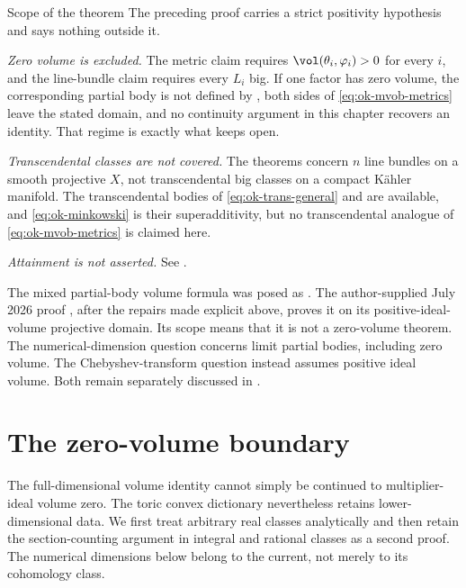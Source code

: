 \begin{warning}{Scope of the theorem}
\label{warn:ok-mixed-scope}
The preceding proof carries a strict positivity hypothesis and says nothing
outside it.

\emph{Zero volume is excluded.}  The metric claim requires
$\vol(\theta_i,\varphi_i)>0$ for every $i$, and
the line-bundle claim requires every $L_i$ big.  If one factor
has zero volume, the corresponding partial body is not defined by
, both sides of
\eqref{eq:ok-mvob-metrics} leave the stated domain, and no continuity
argument in this chapter recovers an identity.  That regime is exactly what
 keeps open.

\emph{Transcendental classes are not covered.}  The theorems concern $n$
line bundles on a smooth projective $X$, not transcendental big
classes on a compact K\"ahler manifold.  The transcendental bodies of
\eqref{eq:ok-trans-general} and  are
available, and \eqref{eq:ok-minkowski} is their superadditivity, but no
transcendental analogue of \eqref{eq:ok-mvob-metrics} is claimed here.

\emph{Attainment is not asserted.}  See .
\end{warning}

\begin{remark}[Status]
\label{rem:ok-mixed-status}
The mixed partial-body volume formula was posed as
\cite[Conjecture~8.8]{Xia21}.  The author-supplied July 2026 proof
\cite{XiaMVOB}, after the repairs made explicit above, proves it on its
positive-ideal-volume projective domain.  Its scope means that it is not a
zero-volume theorem.  The numerical-dimension question
\cite[Conjecture~5.29]{Xia21} concerns limit partial bodies, including
zero volume.  The Chebyshev-transform question
\cite[Section~6.4, p.~1325]{Xia21} instead assumes positive ideal volume.
Both remain separately discussed in .
\end{remark}

\section{The zero-volume boundary}
\label{sec:ok-zero-volume}

The full-dimensional volume identity cannot simply be continued to
multiplier-ideal volume zero.
The toric convex dictionary nevertheless retains lower-dimensional data.
We first treat arbitrary real classes analytically and then retain the
section-counting argument in integral and rational classes as a second
proof.  The numerical dimensions below belong to the current, not merely to
its cohomology class.

